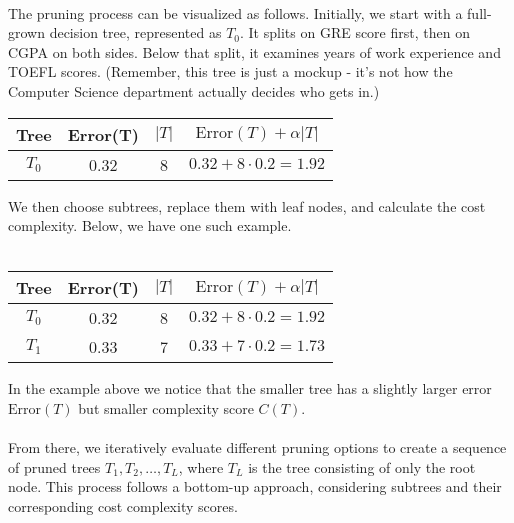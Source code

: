 \documentclass[11pt,a4paper]{report}
\begin{document}
\paragraph{}The pruning process can be visualized as follows. Initially, we start with a full-grown decision tree, represented as $T_0$. It splits on GRE score first, then on CGPA on both sides. Below that split, it examines years of work experience and TOEFL scores. (Remember, this tree is just a mockup - it's not how the Computer Science department actually decides who gets in.)
\begin{center}
\begin{tabular}{|c|c|c|c|}
\hline
Tree & Error(T) & $|T|$ & $\textrm{Error}(T)+\alpha|T|$\\\hline
$T_0$ & 0.32 & 8 & $0.32+8\cdot0.2=1.92$\\\hline
\end{tabular}
\end{center}
We then choose subtrees, replace them with leaf nodes, and calculate the cost complexity. Below, we have one such example.\\
\\
\begin{center}
\begin{tabular}{|c|c|c|c|}
\hline
Tree & Error(T) & $|T|$ & $\textrm{Error}(T)+\alpha|T|$\\\hline
$T_0$ & 0.32 & 8 & $0.32+8\cdot0.2=1.92$\\\hline
$T_1$ & 0.33 & 7 & $0.33+7\cdot0.2=1.73$\\\hline
\end{tabular}
\end{center}
In the example above we notice that the smaller tree has a slightly larger error $\textrm{Error}(T)$ but smaller complexity score $C(T)$.
\paragraph{}From there, we iteratively evaluate different pruning options to create a sequence of pruned trees $T_1, T_2, \dots, T_L$, where $T_L$ is the tree consisting of only the root node. This process follows a bottom-up approach, considering subtrees and their corresponding cost complexity scores.
\end{document}

